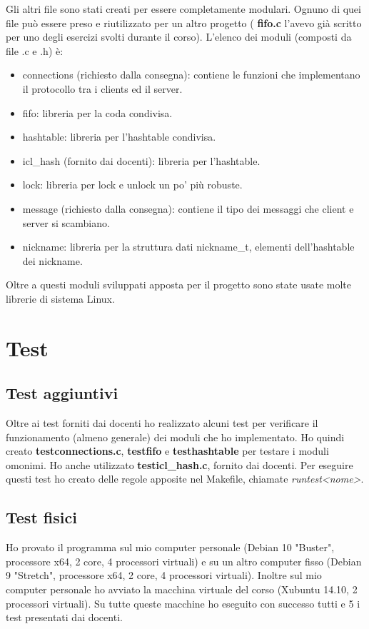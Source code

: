 \documentclass[a4paper]{article}
\theoremstyle{theorem}
\theoremstyle{remark}
\theoremstyle{definition}
\theoremstyle{corollary}
\theoremstyle{lemma}
\newcommand\file[1]{%
	\textbf{#1}}
\begin{document}
Gli altri file sono stati creati per essere completamente modulari. Ognuno di quei file può essere preso e riutilizzato per un altro progetto (\file{fifo.c} l'avevo già scritto per uno degli esercizi svolti durante il corso). L'elenco dei moduli (composti da file .c e .h) è:
\begin{itemize}
	\item connections (richiesto dalla consegna): contiene le funzioni che implementano il protocollo tra i clients ed il server.
	\item fifo: libreria per la coda condivisa. 
	\item hashtable: libreria per l'hashtable condivisa.
	\item icl\_hash (fornito dai docenti): libreria per l'hashtable.
	\item lock: libreria per lock e unlock un po' più robuste.
	\item message (richiesto dalla consegna): contiene il tipo dei messaggi che client e server si scambiano.
	\item nickname: libreria per la struttura dati nickname\_t, elementi dell'hashtable dei nickname.
\end{itemize}

Oltre a questi moduli sviluppati apposta per il progetto sono state usate molte librerie di sistema Linux.

\section{Test}
\subsection{Test aggiuntivi}
Oltre ai test forniti dai docenti ho realizzato alcuni test per verificare il funzionamento (almeno generale) dei moduli che ho implementato. Ho quindi creato \file{testconnections.c}, \file{testfifo} e \file{testhashtable} per testare i moduli omonimi. Ho anche utilizzato \file{testicl\_hash.c}, fornito dai docenti. Per eseguire questi test ho creato delle regole apposite nel Makefile, chiamate \textit{runtest\textless nome\textgreater}.

\subsection{Test fisici}
Ho provato il programma sul mio computer personale (Debian 10 "Buster", processore x64, 2 core, 4 processori virtuali) e su un altro computer fisso (Debian 9 "Stretch", processore x64, 2 core, 4 processori virtuali). Inoltre sul mio computer personale ho avviato la macchina virtuale del corso (Xubuntu 14.10, 2 processori virtuali). Su tutte queste macchine ho eseguito con successo tutti e 5 i test presentati dai docenti.
\end{document}

